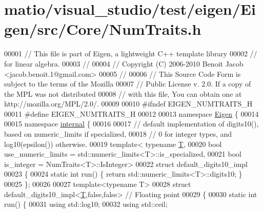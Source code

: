 \hypertarget{matio_2visual__studio_2test_2eigen_2_eigen_2src_2_core_2_num_traits_8h_source}{}\section{matio/visual\+\_\+studio/test/eigen/\+Eigen/src/\+Core/\+Num\+Traits.h}
\label{matio_2visual__studio_2test_2eigen_2_eigen_2src_2_core_2_num_traits_8h_source}

\begin{DoxyCode}
00001 \textcolor{comment}{// This file is part of Eigen, a lightweight C++ template library}
00002 \textcolor{comment}{// for linear algebra.}
00003 \textcolor{comment}{//}
00004 \textcolor{comment}{// Copyright (C) 2006-2010 Benoit Jacob <jacob.benoit.1@gmail.com>}
00005 \textcolor{comment}{//}
00006 \textcolor{comment}{// This Source Code Form is subject to the terms of the Mozilla}
00007 \textcolor{comment}{// Public License v. 2.0. If a copy of the MPL was not distributed}
00008 \textcolor{comment}{// with this file, You can obtain one at http://mozilla.org/MPL/2.0/.}
00009 
00010 \textcolor{preprocessor}{#ifndef EIGEN\_NUMTRAITS\_H}
00011 \textcolor{preprocessor}{#define EIGEN\_NUMTRAITS\_H}
00012 
00013 \textcolor{keyword}{namespace }\hyperlink{namespace_eigen}{Eigen} \{
00014 
00015 \textcolor{keyword}{namespace }\hyperlink{namespaceinternal}{internal} \{
00016 
00017 \textcolor{comment}{// default implementation of digits10(), based on numeric\_limits if specialized,}
00018 \textcolor{comment}{// 0 for integer types, and log10(epsilon()) otherwise.}
00019 \textcolor{keyword}{template}< \textcolor{keyword}{typename} \hyperlink{group___sparse_core___module_class_eigen_1_1_triplet}{T},
00020           \textcolor{keywordtype}{bool} use\_numeric\_limits = std::numeric\_limits<T>::is\_specialized,
00021           \textcolor{keywordtype}{bool} is\_integer = NumTraits<T>::IsInteger>
00022 \textcolor{keyword}{struct }default\_digits10\_impl
00023 \{
00024   \textcolor{keyword}{static} \textcolor{keywordtype}{int} run() \{ \textcolor{keywordflow}{return} std::numeric\_limits<T>::digits10; \}
00025 \};
00026 
00027 \textcolor{keyword}{template}<\textcolor{keyword}{typename} T>
00028 \textcolor{keyword}{struct }default\_digits10\_impl<\hyperlink{group___sparse_core___module_class_eigen_1_1_triplet}{T},false,false> \textcolor{comment}{// Floating point}
00029 \{
00030   \textcolor{keyword}{static} \textcolor{keywordtype}{int} run() \{
00031     \textcolor{keyword}{using} std::log10;
00032     \textcolor{keyword}{using} std::ceil;

\end{DoxyCode}
